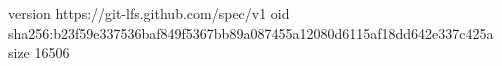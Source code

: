 version https://git-lfs.github.com/spec/v1
oid sha256:b23f59e337536baf849f5367bb89a087455a12080d6115af18dd642e337c425a
size 16506
